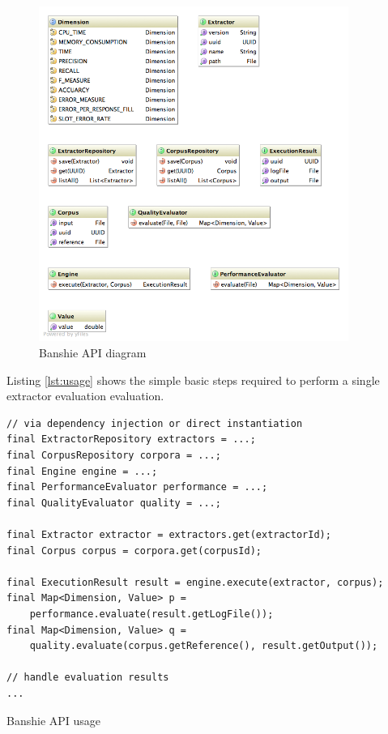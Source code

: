 \begin{figure}[H]
\centering
\includegraphics[width=0.9\textwidth]{api.png}
\caption{Banshie API diagram}
\label{fig:api}
\end{figure}

\newpage
Listing \ref{lst:usage} shows the simple basic steps required to perform a single extractor evaluation evaluation.

\begin{listing}[H]
\begin{verbatim}
// via dependency injection or direct instantiation
final ExtractorRepository extractors = ...;
final CorpusRepository corpora = ...;
final Engine engine = ...;
final PerformanceEvaluator performance = ...;
final QualityEvaluator quality = ...;

final Extractor extractor = extractors.get(extractorId);
final Corpus corpus = corpora.get(corpusId);

final ExecutionResult result = engine.execute(extractor, corpus);
final Map<Dimension, Value> p = 
    performance.evaluate(result.getLogFile());
final Map<Dimension, Value> q = 
    quality.evaluate(corpus.getReference(), result.getOutput());

// handle evaluation results
...
\end{verbatim}
\caption{Banshie API usage}
\label{lst:usage}
\end{listing}

